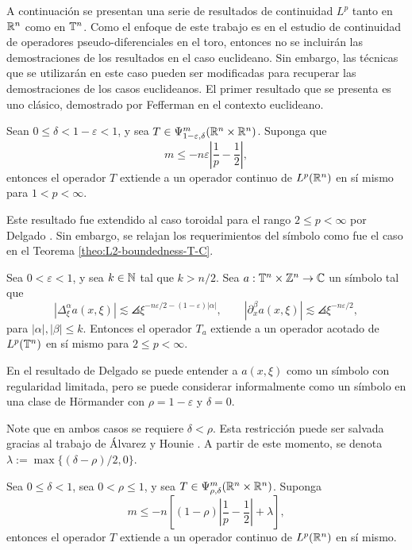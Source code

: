 A continuación se presentan una serie de resultados de continuidad $L^p$ tanto en $\mathbb{R}^n$ como en $\mathbb{T}^n$. Como el enfoque de este trabajo es en el estudio de continuidad de operadores pseudo-diferenciales en el toro, entonces no se incluirán las demostraciones de los resultados en el caso euclideano. Sin embargo, las técnicas que se utilizarán en este caso pueden ser modificadas para recuperar las demostraciones de los casos euclideanos. El primer resultado que se presenta es uno clásico, demostrado por Fefferman \cite{fefferman-Lp} en el contexto euclideano. 
\begin{theorem}[Fefferman]
	Sean $0\leq\delta<1-\varepsilon<1$, y sea $T\in \Psi^m_{1-\varepsilon, \delta}(\mathbb{R}^n\times\mathbb{R}^n)$. Suponga que 
	\begin{equation*}
		m \leq - n\varepsilon\left|\frac{1}{p} - \frac{1}{2}\right|,
	\end{equation*}
	entonces el operador $T$ extiende a un operador continuo de $L^p(\mathbb{R}^n)$ en sí mismo para $1<p<\infty$.
\end{theorem} 
Este resultado fue extendido al caso toroidal para el rango $2\leq p<\infty$ por Delgado \cite{delgado}. Sin embargo, se relajan los requerimientos del símbolo como fue el caso en el Teorema \ref{theo:L2-boundedness-T-C}.
\begin{theorem}[Delgado]
	Sea $0<\varepsilon<1$, y sea $k\in\mathbb{N}$ tal que $k>n/2$. Sea $a:\mathbb{T}^n\times\mathbb{Z}^n\to\mathbb{C}$ un símbolo tal que 
	\begin{equation*}
		|\Delta^\alpha_\xi a(x, \xi)| \lesssim \angles{\xi}^{-n\varepsilon/2-(1-\varepsilon)|\alpha|}, \quad \quad |\partial^\beta_x a(x, \xi)| \lesssim \angles{\xi}^{-n\varepsilon/2},
	\end{equation*}
	para $|\alpha|,|\beta|\leq k$. Entonces el operador $T_a$ extiende a un operador acotado de $L^p(\mathbb{T}^n)$ en sí mismo para $2\leq p<\infty$.
\end{theorem}
\begin{remark}
	En el resultado de Delgado se puede entender a $a(x, \xi)$ como un símbolo con regularidad limitada, pero se puede considerar informalmente como un símbolo en una clase de H\"ormander con $\rho=1-\varepsilon$ y $\delta=0$.
\end{remark}
Note que en ambos casos se requiere $\delta < \rho$. Esta restricción puede ser salvada gracias al trabajo de \'Alvarez y Hounie \cite{alvarez-hounie}. A partir de este momento, se denota $\lambda := \max\{(\delta - \rho)/2, 0\}$.
\begin{theorem}\label{theo:Alvarez-Hounie}
	Sea $0\leq\delta<1$, sea $0<\rho\leq1$, y sea $T\in\Psi^m_{\rho, \delta}(\mathbb{R}^n\times\mathbb{R}^n)$. Suponga 
	\begin{equation*}
		m \leq -n \left[(1-\rho)\left|\frac{1}{p} - \frac{1}{2}\right|+\lambda\right],
	\end{equation*}
	entonces el operador $T$ extiende a un operador continuo de $L^p(\mathbb{R}^n)$ en sí mismo. 
\end{theorem}
